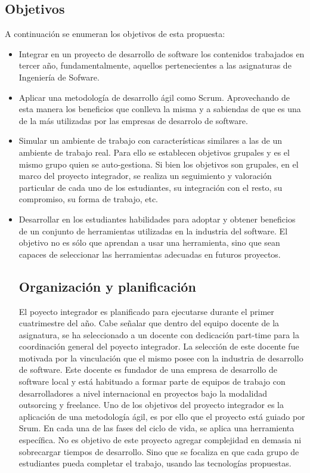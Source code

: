 \subsection{Objetivos}
A continuación se enumeran los objetivos de esta propuesta:
 \begin{itemize}
 \item Integrar en un  proyecto de desarrollo de software los contenidos trabajados en tercer año, fundamentalmente, aquellos
 pertenecientes a las asignaturas de Ingeniería de Sofware. 
 \item Aplicar una metodología de desarrollo ágil como Scrum. Aprovechando de esta manera los beneficios que conlleva la misma y a sabiendas de que 
 es una de la más utilizadas por las empresas de desarrolo de software.
 \item Simular un ambiente de trabajo con características similares a las de un ambiente de trabajo real. Para ello se establecen objetivos grupales 
 y es el mismo grupo quien se auto-gestiona. Si bien los objetivos son grupales, en el marco del proyecto integrador, 
 se realiza un seguimiento y valoración particular de cada uno de los 
 estudiantes, su integración con el resto, su compromiso, su forma de trabajo, etc.
 \item Desarrollar en los estudiantes habilidades para adoptar y obtener beneficios  de un conjunto de herramientas utilizadas en la industria del software. 
 El objetivo no es sólo que aprendan a usar una herramienta, 
 sino que sean capaces de seleccionar las herramientas adecuadas en futuros proyectos.
 
 
 \subsection{Organización y planificación}
El poyecto integrador es planificado para ejecutarse durante el primer cuatrimestre del año. Cabe señalar
que dentro del equipo docente de la asignatura, se ha seleccionado a un docente  con dedicación part-time para la coordinación general 
del poyecto integrador. La selección de este docente fue motivada por la vinculación que  el mismo posee con la industria de desarrollo de software. 
Este docente es fundador de una empresa de desarrollo de software local y está habituado a formar parte de equipos de trabajo
con desarrolladores a nivel internacional en proyectos bajo la modalidad outsorcing y freelance. 
Uno de los objetivos del proyecto integrador es la aplicación de una metodología ágil, es por ello que el proyecto está guiado por Srum.
En cada una de las fases del ciclo de vida, se aplica una herramienta específica. No es objetivo de este 
proyecto agregar complejidad en demasia  ni sobrecargar tiempos de desarrollo. Sino que se focaliza en que cada 
grupo de estudiantes pueda completar el trabajo, usando las tecnologías propuestas.  
 
 \end{itemize}
% 